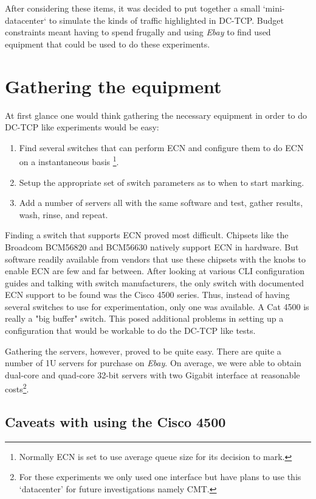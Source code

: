 \documentclass[12pt]{article}
\begin{document}
After considering these items, it was decided to put together a small `mini-datacenter` to simulate the
kinds of traffic highlighted in DC-TCP. Budget constraints meant having to spend frugally and 
using \emph{Ebay} to find used equipment that could be used to do these experiments.

\section{Gathering the equipment}

At first glance one would think gathering the necessary equipment in order to do DC-TCP like
experiments would be easy:
\begin{enumerate}
\item Find several switches that can perform ECN and configure them
to do ECN on a instantaneous basis \footnote{Normally ECN is set to use average queue size
for its decision to mark.}. 

\item Setup the appropriate set of switch parameters as to when to start
marking. 

\item Add a number of servers all with the same software and test, gather results, wash, rinse, and repeat.
\end{enumerate}

Finding a switch that supports ECN proved most difficult.  
Chipsets like the Broadcom BCM56820 and BCM56630 natively support 
ECN in hardware. But software readily available from vendors that use these chipsets with
the knobs to enable ECN are few and far between. After looking at various CLI
configuration guides and talking with switch manufacturers, the only switch with documented
ECN support to be found was the Cisco 4500 series. Thus, instead of having several switches
to use for experimentation, only one was available. A Cat 4500 is really a "big buffer"
switch. This posed additional problems in setting up a configuration that would be workable
to do the DC-TCP like tests.

Gathering the servers, however, proved to be quite easy. There are quite a number of 1U servers
for purchase on \emph{Ebay}. On average, we were able to obtain dual-core and quad-core 32-bit 
servers with two Gigabit interface at reasonable costs\footnote{For these experiments we only used
one interface but have plans to use this `datacenter' for future investigations  namely CMT.}. 


\subsection{Caveats with using the Cisco 4500}
\end{document}
